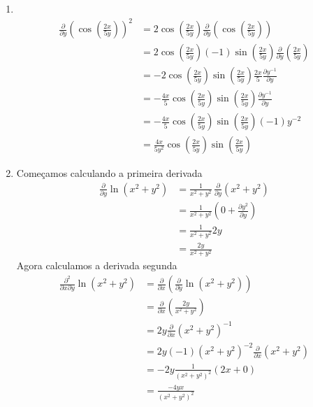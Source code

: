 \documentclass[a4paper,12pt,fleqn]{article}
\newcommand{\D}[2]{\frac{\partial {#1}}{\partial {#2}}}
\newcommand{\DM}[3]{\frac{\partial^2 {#1}}{\partial {#2} \partial {#3}}}
\begin{document}
\begin{answer}
  \begin{enumerate}
    \item[a)] ~\vspace{-2.1\baselineskip}
    \begin{align*}
      \D{}{y} \left(\cos\left(\frac{2x}{5y}\right)\right)^2
      & = 2\cos\left(\frac{2x}{5y}\right)
          \D{}{y}\left(\cos\left(\frac{2x}{5y}\right)\right)  \\[2mm]
      & = 2\cos\left(\frac{2x}{5y}\right)
          (-1)\sin\left(\frac{2x}{5y}\right)
          \D{}{y}\left(\frac{2x}{5y}\right)  \\[2mm]
      & = -2\cos\left(\frac{2x}{5y}\right)
          \sin\left(\frac{2x}{5y}\right)
          \frac{2x}{5}\D{y^{-1}}{y}  \\[2mm]
      & = -\frac{4x}{5}\cos\left(\frac{2x}{5y}\right)
          \sin\left(\frac{2x}{5y}\right)
          \D{y^{-1}}{y}  \\[2mm]
      & = -\frac{4x}{5}\cos\left(\frac{2x}{5y}\right)
          \sin\left(\frac{2x}{5y}\right)
          (-1)y^{-2}  \\[2mm]
      & = \frac{4x}{5y^2}\cos\left(\frac{2x}{5y}\right)
          \sin\left(\frac{2x}{5y}\right)
    \end{align*}
    \item[b)] Começamos calculando a primeira derivada
    \begin{align*}
      \D{}{y} \ln\left(x^2 + y^2\right)
      & = \frac{1}{x^2 + y^2} \, \D{}{y} \left(x^2 + y^2\right) \\[2mm]
      & = \frac{1}{x^2 + y^2} \left(0 + \D{y^2}{y}\right) \\[2mm]
      & = \frac{1}{x^2 + y^2} 2y \\[2mm]
      & = \frac{2y}{x^2 + y^2}
    \end{align*}
    Agora calculamos a derivada segunda
    \begin{align*}
      \DM{}{x}{y} \ln\left(x^2 + y^2\right)
      & = \D{}{x}\left(\D{}{y} \ln\left(x^2 + y^2\right)\right) \\[2mm]
      & = \D{}{x}\left(\frac{2y}{x^2 + y^2} \right) \\[2mm]
      & = 2y\D{}{x}\left(x^2 + y^2\right)^{-1} \\[2mm]
      & = 2y(-1)\left(x^2 + y^2\right)^{-2}\D{}{x}\left(x^2 + y^2\right) \\[2mm]
      & = -2y\frac{1}{\left(x^2 + y^2\right)^2}\left(2x + 0\right) \\[2mm]
      & = \frac{-4yx}{\left(x^2 + y^2\right)^2}
    \end{align*}
  \end{enumerate}
\end{answer}


\end{document}

